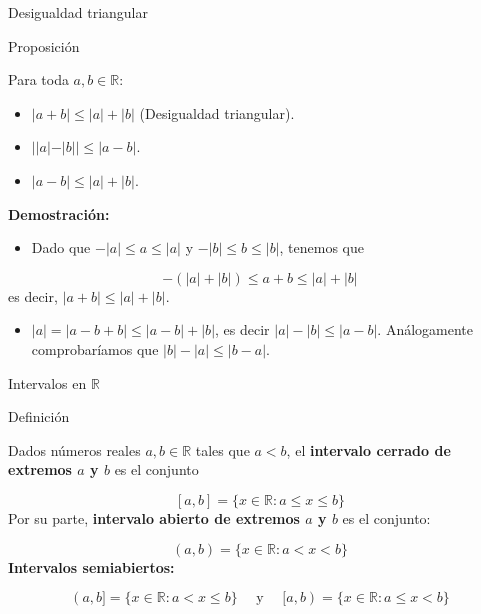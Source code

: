 \documentclass[
  ignorenonframetext,
]{beamer}
\providecommand{\tightlist}{%
  \setlength{\itemsep}{0pt}\setlength{\parskip}{0pt}}
\begin{document}
\begin{frame}{Desigualdad triangular}
\protect\hypertarget{desigualdad-triangular}{}

Proposición

Para toda \(a,b \in \mathbb{R}\):

\begin{itemize}
\tightlist
\item
  \(|a+b| \leq |a| + |b|\) (Desigualdad triangular).
\item
  \(||a|-|b|| \leq |a-b|\).
\item
  \(|a-b| \leq |a|+|b|\).
\end{itemize}

\textbf{Demostración:}

\begin{itemize}
\tightlist
\item
  Dado que \(-|a| \leq a \leq |a|\) y \(-|b| \leq b \leq |b|\), tenemos
  que
\end{itemize}

\[ 
-(|a|+|b|) \leq a+b \leq  |a| + |b|
\] es decir, \(|a+b| \leq |a| + |b|\).

\begin{itemize}
\tightlist
\item
  \(|a| = |a-b+b| \leq |a-b| + |b|\), es decir \(|a|-|b| \leq |a-b|\).
  Análogamente comprobaríamos que \(|b|-|a| \leq |b-a|\).
\end{itemize}

\end{frame}

\begin{frame}{Intervalos en \(\mathbb{R}\)}
\protect\hypertarget{intervalos-en-mathbbr}{}

Definición

Dados números reales \(a,b \in \mathbb{R}\) tales que \(a<b\), el
\textbf{intervalo cerrado de extremos \(a\) y \(b\)} es el conjunto

\[
[a,b] = \{x\in \mathbb{R}: a \leq x \leq b \}
\] Por su parte, \textbf{intervalo abierto de extremos \(a\) y \(b\)} es
el conjunto:

\[
(a,b) = \{x\in \mathbb{R}: a < x < b \}
\] \textbf{Intervalos semiabiertos:}

\[
(a,b] = \{ x \in \mathbb{R}: a<x \leq b \} \quad \text{ y } \quad [a,b) = \{ x \in \mathbb{R}: a \leq x < b \}
\]

\end{frame}
\end{document}
